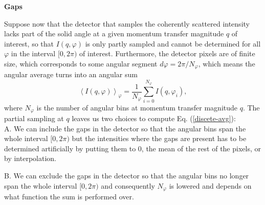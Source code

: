 \documentclass[12pt]{article}
\begin{document}
\newpage

\vspace{1cm}
\begin{sffamily}
\begin{Large}
\textbf{Gaps}\\
\end{Large}
\end{sffamily}
\vspace{0.3cm}

Suppose now that the detector that samples the coherently scattered intensity lacks part of the solid angle at a given momentum transfer magnitude $q$ of interest, so that $I(q,\varphi)$ is only partly sampled and cannot be determined for all $\varphi$ in the interval $[0,2\pi)$ of interest. Furthermore, the detector pixels are of finite size, which corresponds to some angular segment $d\varphi = 2\pi/N_{\varphi}$, which means the angular average turns into an angular sum
\begin{equation}\label{discete-avg}
\left\langle I(q,\varphi) \right\rangle_{\varphi} = \frac{1}{N_{\varphi}} \sum_{i=0}^{N_{\varphi}} I(q,\varphi_i),
\end{equation}
where $N_{\varphi}$ is the number of angular bins at momentum transfer magnitude $q$. The partial sampling at $q$ leaves us two choices to compute Eq. (\ref{discete-avg}):\\

A. We can include the gaps in the detector so that the angular bins span the whole interval $[0,2\pi)$ but the intensities where the gaps are present has to be determined artificially by putting them to 0, the mean of the rest of the pixels, or by interpolation.

B. We can exclude the gaps in the detector so that the angular bins no longer span the whole interval $[0,2\pi)$ and consequently $N_{\varphi}$ is lowered and depends on what function the sum is performed over.\\
\end{document}
